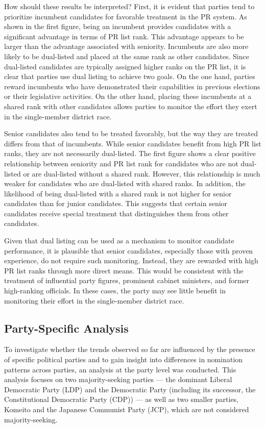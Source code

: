 \documentclass[a4paper, 11pt]{article}
\begin{document}
How should these results be interpreted? First, it is evident that parties tend to prioritize incumbent candidates for favorable treatment in the PR system. As shown in the first figure, being an incumbent provides candidates with a significant advantage in terms of PR list rank. This advantage appears to be larger than the advantage associated with seniority. Incumbents are also more likely to be dual-listed and placed at the same rank as other candidates. Since dual-listed candidates are typically assigned higher ranks on the PR list, it is clear that parties use dual listing to achieve two goals. On the one hand, parties reward incumbents who have demonstrated their capabilities in previous elections or their legislative activities. On the other hand, placing these incumbents at a shared rank with other candidates allows parties to monitor the effort they exert in the single-member district race.

Senior candidates also tend to be treated favorably, but the way they are treated differs from that of incumbents. While senior candidates benefit from high PR list ranks, they are not necessarily dual-listed. The first figure shows a clear positive relationship between seniority and PR list rank for candidates who are not dual-listed or are dual-listed without a shared rank. However, this relationship is much weaker for candidates who are dual-listed with shared ranks. In addition, the likelihood of being dual-listed with a shared rank is not higher for senior candidates than for junior candidates. This suggests that certain senior candidates receive special treatment that distinguishes them from other candidates.

Given that dual listing can be used as a mechanism to monitor candidate performance, it is plausible that senior candidates, especially those with proven experience, do not require such monitoring. Instead, they are rewarded with high PR list ranks through more direct means. This would be consistent with the treatment of influential party figures, prominent cabinet ministers, and former high-ranking officials. In these cases, the party may see little benefit in monitoring their effort in the single-member district race.

\subsection{Party-Specific Analysis}

To investigate whether the trends observed so far are influenced by the presence of specific political parties and to gain insight into differences in nomination patterns across parties, an analysis at the party level was conducted. This analysis focuses on two majority-seeking parties — the dominant Liberal Democratic Party (LDP) and the Democratic Party (including its successor, the Constitutional Democratic Party (CDP)) — as well as two smaller parties, Komeito and the Japanese Communist Party (JCP), which are not considered majority-seeking. 
\end{document}

